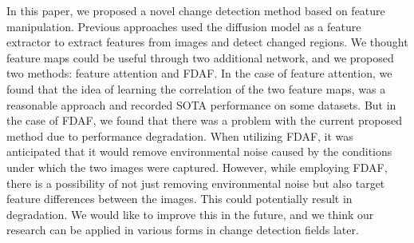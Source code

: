 \documentclass[../main.tex]{subfiles}
\begin{document}
In this paper, we proposed a novel change detection method based on feature manipulation. Previous approaches used the diffusion model as a feature extractor to extract features from images and detect changed regions. We thought feature maps could be useful through two additional network, and we proposed two methods: feature attention and FDAF. 
In the case of feature attention, we found that the idea of learning the correlation of the two feature maps, was a reasonable approach and recorded SOTA performance on some datasets. But in the case of FDAF, we found that there was a problem with the current proposed method due to performance degradation. When utilizing FDAF, it was anticipated that it would remove environmental noise caused by the conditions under which the two images were captured. However, while employing FDAF, there is a possibility of not just removing environmental noise but also target feature differences between the images. This could potentially result in degradation. We would like to improve this in the future, and we think our research can be applied in various forms in change detection fields later.
\end{document}
